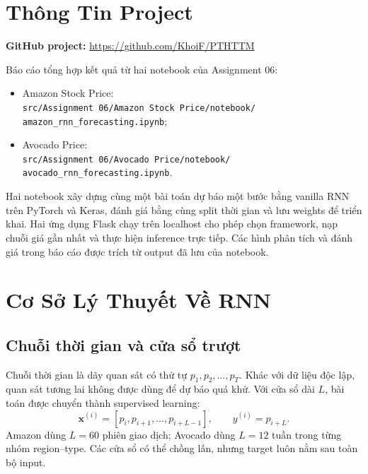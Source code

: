 \documentclass[12pt,a4paper]{report}
\newcommand{\modelpath}[1]{\texttt{#1}}
\begin{document}
\tableofcontents
\newpage
\listoffigures
\newpage
\listoftables
\newpage
{}

\chapter*{Thông Tin Project}
\noindent\textbf{GitHub project:} \url{https://github.com/KhoiF/PTHTTM}

\vspace{0.4cm}
\noindent Báo cáo tổng hợp kết quả từ hai notebook của Assignment 06:
\begin{itemize}
    \item Amazon Stock Price:\\
    \modelpath{src/Assignment 06/Amazon Stock Price/notebook/}\\
    \modelpath{amazon\_rnn\_forecasting.ipynb};
    \item Avocado Price:\\
    \modelpath{src/Assignment 06/Avocado Price/notebook/}\\
    \modelpath{avocado\_rnn\_forecasting.ipynb}.
\end{itemize}

Hai notebook xây dựng cùng một bài toán dự báo một bước bằng vanilla RNN trên PyTorch và Keras,
đánh giá bằng cùng split thời gian và lưu weights để triển khai. Hai ứng dụng Flask chạy trên localhost
cho phép chọn framework, nạp chuỗi giá gần nhất và thực hiện inference trực tiếp.
Các hình phân tích và đánh giá trong báo cáo được trích từ output đã lưu của notebook.
\newpage

\chapter{Cơ Sở Lý Thuyết Về RNN}

\section{Chuỗi thời gian và cửa sổ trượt}
Chuỗi thời gian là dãy quan sát có thứ tự
$p_1,p_2,\ldots,p_T$. Khác với dữ liệu độc lập, quan sát tương lai không được dùng để dự báo quá khứ.
Với cửa sổ dài $L$, bài toán được chuyển thành supervised learning:
\begin{equation}
    \mathbf{x}^{(i)}=[p_i,p_{i+1},\ldots,p_{i+L-1}],\qquad
    y^{(i)}=p_{i+L}.
\end{equation}
Amazon dùng $L=60$ phiên giao dịch; Avocado dùng $L=12$ tuần trong từng nhóm region--type.
Các cửa sổ có thể chồng lấn, nhưng target luôn nằm sau toàn bộ input.
\end{document}
